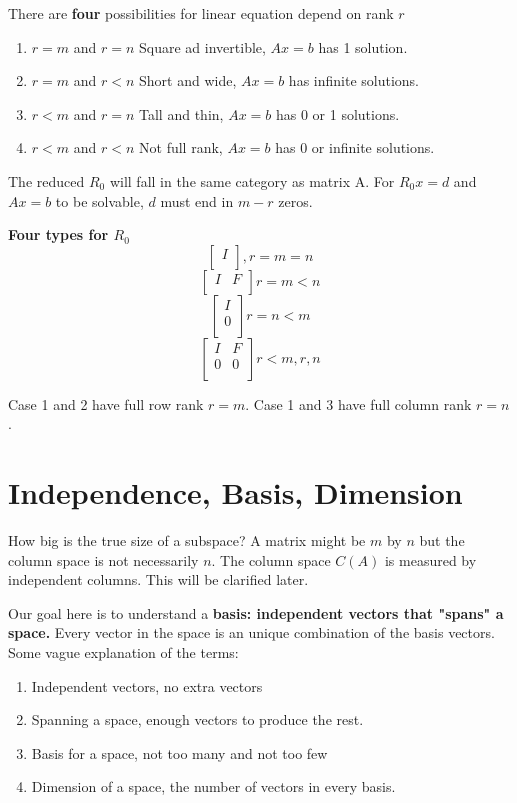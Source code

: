 There are \textbf{four} possibilities for linear equation depend on rank \(r\)
\begin{enumerate}
    \item \(r = m\) and \(r = n\) Square ad invertible, \(Ax = b\) has 1 solution. 
    \item \(r = m\) and \(r < n\) Short and wide, \(Ax = b\) has infinite solutions.    
    \item \(r < m\) and \(r = n\) Tall and thin, \(Ax = b\) has 0 or 1 solutions. 
    \item \(r < m\) and \(r < n\) Not full rank, \(Ax = b\) has 0 or infinite solutions.        
\end{enumerate} 

The reduced \(R_0\) will fall in the same category as matrix A. For \(R_{0}x = d\) and \(Ax = b\) to be solvable, \(d\) must end in \( m - r\) zeros. 

\textbf{Four types for \(R_0\) }
\[
    \begin{bmatrix}
         I \\
    \end{bmatrix}
    , r = m = n
\] 
\[
    \begin{bmatrix}
        I & F  \\
    \end{bmatrix}
    r = m < n 
\]
\[
    \begin{bmatrix}
         I \\
         0 \\
    \end{bmatrix}
    r = n < m
\]
\[
    \begin{bmatrix}
        I & F  \\
        0 & 0  \\
    \end{bmatrix}
    r < m, r , n
\]

Case 1 and 2 have full row rank \(r = m\). Case 1 and 3 have full column rank \(r = n\).  

\section{Independence, Basis, Dimension}

How big is the true size of a subspace? A matrix might be \(m\) by \(n\) but the column space is not necessarily \(n\). The column space \(C(A)\) is measured by independent columns. This will be clarified later. 

Our goal here is to understand a \textbf{basis: independent vectors that "spans" a space.} Every vector in the space is an unique combination of the basis vectors. 
Some vague explanation of the terms:
\begin{enumerate}
    \item Independent vectors, no extra vectors 
    \item Spanning a space, enough vectors to produce the rest. 
    \item Basis for a space, not too many and not too few 
    \item Dimension of a space, the number of vectors in every basis. 
\end{enumerate}


